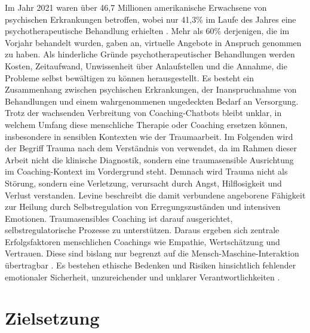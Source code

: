 Im Jahr 2021 waren über 46,7 Millionen amerikanische Erwachsene von psychischen Erkrankungen betroffen, wobei nur 41,3\% im Laufe des Jahres eine psychotherapeutische
Behandlung erhielten \citep{Forman-Hoffman2025Prevalence}. Mehr als 60\% derjenigen, die im Vorjahr behandelt wurden,
gaben an, virtuelle Angebote in Anspruch genommen zu haben. Als hinderliche Gründe psychotherapeutischer Behandlungen werden Kosten, Zeitaufwand, Unwissenheit über Anlaufstellen und die Annahme, die Probleme
selbst bewältigen zu können herausgestellt. Es besteht ein Zusammenhang zwischen psychischen Erkrankungen, der Inanspruchnahme von Behandlungen und einem
wahrgenommenen ungedeckten Bedarf an Versorgung.
Trotz der wachsenden Verbreitung von Coaching-Chatbots bleibt unklar, in
welchem Umfang diese menschliche Therapie oder Coaching ersetzen können, insbesondere
in sensiblen Kontexten wie der Traumaarbeit. Im Folgenden wird der Begriff Trauma nach
dem Verständnis von \cite{Levine2010}  verwendet, da im Rahmen dieser Arbeit nicht die
klinische Diagnostik, sondern eine traumasensible Ausrichtung im Coaching-Kontext im
Vordergrund steht. Demnach wird Trauma nicht als Störung, sondern eine Verletzung,
verursacht durch Angst, Hilflosigkeit und Verlust verstanden. Levine beschreibt die damit
verbundene angeborene Fähigkeit zur Heilung durch Selbstregulation von Erregungszuständen und intensiven Emotionen. Traumasensibles Coaching ist darauf ausgerichtet,
selbstregulatorische Prozesse zu unterstützen. Daraus ergeben sich zentrale Erfolgsfaktoren menschlichen Coachings wie Empathie, Wertschätzung und Vertrauen. Diese sind bislang nur begrenzt auf
die Mensch-Maschine-Interaktion übertragbar \citep{mai2020ai}.  Es bestehen ethische Bedenken und Risiken hinsichtlich fehlender emotionaler Sicherheit, unzureichender und unklarer Verantwortlichkeiten \citep{passmore2023can}.

\section{Zielsetzung}

